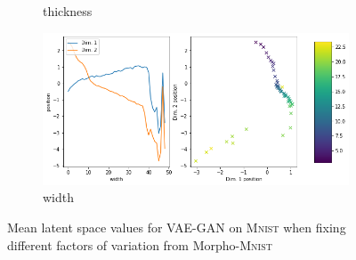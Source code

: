 \begin{figure}[H]
\begin{subfigure}{.48\textwidth}
        \caption{thickness}
    \end{subfigure}
    \begin{subfigure}{.48\textwidth}
        \includegraphics[width=\textwidth]{images/latent_space_traversals/vae_gan_mnist_morpho_latent_space_values_width.png}
        \caption{width}
    \end{subfigure}
    \caption{Mean latent space values for \ac{VAE}-\ac{GAN} on \textsc{Mnist} when fixing different factors of variation from Morpho-\textsc{Mnist}}
    \label{fig:vae_gan_mnist_morpho_latent_space_values}
\end{figure}

